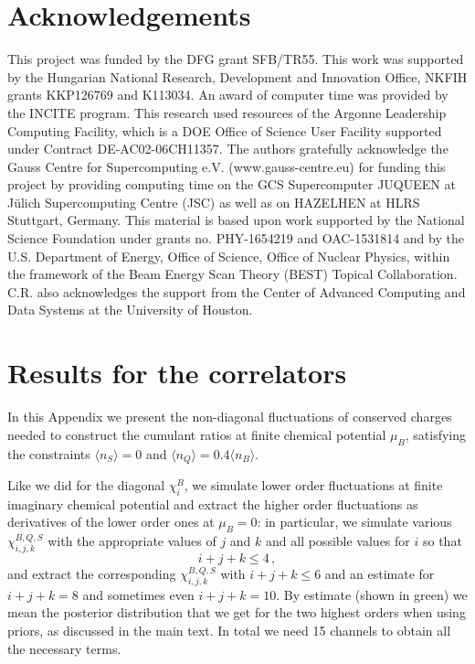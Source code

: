 \documentclass[a4paper,11pt]{article}
\begin{document}
\section*{Acknowledgements}
This project was funded by the DFG grant SFB/TR55.
This work was supported by the Hungarian National Research,  Development and
Innovation Office, NKFIH grants KKP126769 and K113034.  An award of computer
time  was  provided  by  the  INCITE  program. This  research  used  resources
of  the  Argonne  Leadership Computing Facility,  which is a DOE Office of
Science User Facility supported under Contract DE-AC02-06CH11357.
The authors gratefully acknowledge the Gauss Centre for Supercomputing e.V.
(www.gauss-centre.eu) for funding this project by providing computing time on
the GCS Supercomputer JUQUEEN\cite{juqueen} at J\"ulich Supercomputing Centre
(JSC) as well as on HAZELHEN at HLRS Stuttgart, Germany.
This  material  is  based  upon  work  supported  by  the
National  Science  Foundation  under  grants  no. PHY-1654219 and OAC-1531814 and by the U.S. Department
of  Energy,  Office  of  Science,  Office  of  Nuclear  Physics, within the framework of the Beam Energy Scan Theory
(BEST) Topical Collaboration.  C.R. also acknowledges the support from the Center of Advanced Computing and
Data Systems at the University of Houston.
\clearpage
\appendix
\section{Results for the correlators\label{sec:correlators}}

In this Appendix we present the non-diagonal fluctuations of conserved charges
needed to construct the cumulant ratios at finite chemical potential $\mu_B$,
satisfying the constraints $\langle n_S\rangle=0$ and $\langle
n_Q\rangle=0.4\langle n_B\rangle$.

Like we did for the diagonal $\chi_i^B$, we simulate lower order fluctuations
at finite imaginary chemical potential and extract the higher order
fluctuations as derivatives of the lower order ones at $\mu_B=0$: in
particular, we simulate various $ \chi^{B,Q,S}_{i,j,k}$ with the appropriate
values of $j$ and $k$ and all possible values for $i$ so that
\begin{equation}
 i+j+k \leq 4\,,
\end{equation}
and extract the corresponding $ \chi^{B,Q,S}_{i,j,k}$ with $i+j+k \leq 6 $ and
an estimate for $i+j+k = 8 $ and sometimes even $i+j+k = 10$. By estimate
(shown in green) we mean the posterior distribution that we get for the two highest orders
when using priors, as discussed in the main text.
In total we need 15 channels to obtain all the necessary terms.
\end{document}
